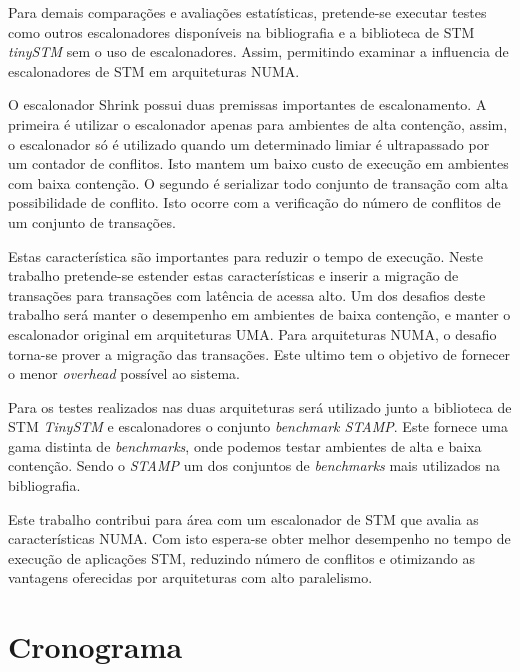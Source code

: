 \documentclass[diss-proposta,nocipinfo]{texufpel}
\begin{document}
Para demais comparações e avaliações estatísticas, pretende-se executar testes como outros escalonadores disponíveis na bibliografia e a biblioteca de STM \emph{tinySTM} sem o uso de escalonadores. Assim, permitindo examinar a influencia de escalonadores de STM em arquiteturas NUMA.

O escalonador Shrink possui duas premissas importantes de escalonamento. A primeira é utilizar o escalonador apenas para ambientes de alta contenção, assim, o escalonador só é utilizado quando um determinado limiar é ultrapassado por um contador de conflitos. Isto mantem um baixo custo de execução em ambientes com baixa contenção. O segundo é serializar todo conjunto de transação com alta possibilidade de conflito. Isto ocorre com a verificação do número de conflitos de um conjunto de transações.

Estas característica são importantes para reduzir o tempo de execução. Neste trabalho pretende-se estender estas características e inserir a migração de transações para transações com latência de acessa alto. Um dos desafios deste trabalho será manter o desempenho em ambientes de baixa contenção, e manter o escalonador original em arquiteturas UMA. Para arquiteturas NUMA, o desafio torna-se prover a migração das transações. Este ultimo tem o objetivo de fornecer o menor \emph{overhead} possível ao sistema.

Para os testes realizados nas duas arquiteturas será utilizado junto a biblioteca de STM \emph{TinySTM} e escalonadores o conjunto \emph{benchmark STAMP}. Este fornece uma gama distinta de \emph{benchmarks}, onde podemos testar ambientes de alta e baixa contenção. Sendo o \emph{STAMP} um dos conjuntos de \emph{benchmarks} mais utilizados na bibliografia.

Este trabalho contribui para área com um escalonador de STM que avalia as características NUMA. Com isto espera-se obter melhor desempenho no tempo de execução de aplicações STM, reduzindo número de conflitos e otimizando as vantagens oferecidas por arquiteturas com alto paralelismo.


\chapter{Cronograma}
\end{document}
